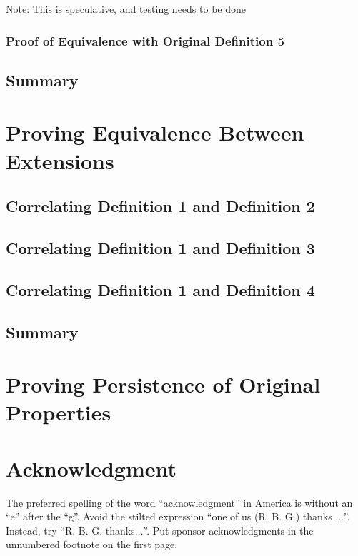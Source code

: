 \documentclass[conference]{IEEEtran}
\begin{document}
Note: This is speculative, and testing needs to be done

\subsubsection{Proof of Equivalence with Original Definition 5}

\subsection{Summary}

\section{Proving Equivalence Between Extensions}

\subsection{Correlating Definition 1 and Definition 2}

\subsection{Correlating Definition 1 and Definition 3}

\subsection{Correlating Definition 1 and Definition 4}

\subsection{Summary}

\section{Proving Persistence of Original Properties}

\section{Acknowledgment}

The preferred spelling of the word ``acknowledgment'' in America is without 
an ``e'' after the ``g''. Avoid the stilted expression ``one of us (R. B. 
G.) thanks $\ldots$''. Instead, try ``R. B. G. thanks$\ldots$''. Put sponsor 
acknowledgments in the unnumbered footnote on the first page.
\end{document}
